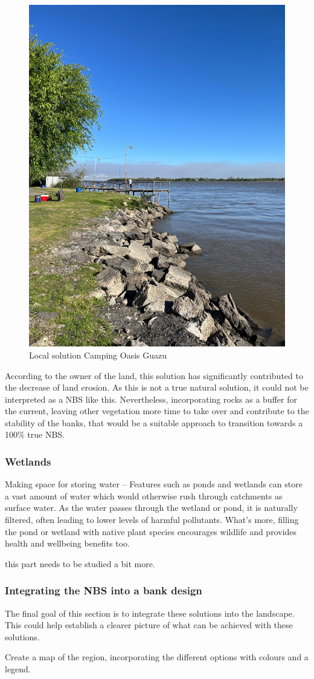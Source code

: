 \begin{figure}[H]
    \centering
    \includegraphics[width=0.75\linewidth]{figures/appendixE/rocks.jpg}
    \caption{Local solution Camping Oasis Guazu}
    \label{fig:local solution Camping Oasis Guazu}
\end{figure}

According to the owner of the land, this solution has significantly contributed to the decrease of land erosion. As this is not a true natural solution, it could not be interpreted as a NBS like this. Nevertheless, incorporating rocks as a buffer for the current, leaving other vegetation more time to take over and contribute to the stability of the banks, that would be a suitable approach to transition towards a 100\% true NBS.


\subsubsection{Wetlands}
Making space for storing water – Features such as ponds and wetlands can store a vast amount of water which would otherwise rush through catchments as surface water. As the water passes through the wetland or pond, it is naturally filtered, often leading to lower levels of harmful pollutants. What’s more, filling the pond or wetland with native plant species encourages wildlife and provides health and wellbeing benefits too.

this part needs to be studied a bit more.

\subsubsection{Integrating the NBS into a bank design}

The final goal of this section is to integrate these solutions into the landscape. This could help establish a clearer picture of what can be achieved with these solutions.

Create a map of the region, incorporating the different options with colours and a legend.